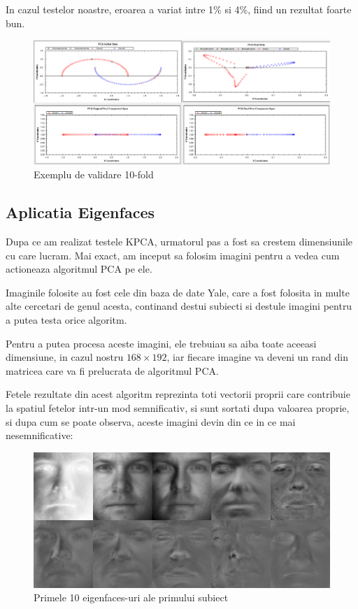 \documentclass[12pt]{article}
\begin{document}
In cazul testelor noastre, eroarea a variat intre 1\% si 4\%, fiind un rezultat foarte bun.

\begin{figure}[H]
\centering
\caption{Exemplu de validare 10-fold}
\includegraphics[width=\linewidth]{tenfold1}
\end{figure}

\newpage

\subsection{Aplicatia Eigenfaces}
Dupa ce am realizat testele KPCA, urmatorul pas a fost sa crestem dimensiunile cu care lucram. Mai exact, am inceput sa folosim imagini pentru a vedea cum actioneaza algoritmul PCA pe ele.

Imaginile folosite au fost cele din baza de date Yale, care a fost folosita in multe alte cercetari de genul acesta, continand destui subiecti si destule imagini pentru a putea testa orice algoritm.

Pentru a putea procesa aceste imagini, ele trebuiau sa aiba toate aceeasi dimensiune, in cazul nostru $168 \times 192$, iar fiecare imagine va deveni un rand din matricea care va fi prelucrata de algoritmul PCA.

Fetele rezultate din acest algoritm reprezinta toti vectorii proprii care contribuie la spatiul fetelor intr-un mod semnificativ, si sunt sortati dupa valoarea proprie, si dupa cum se poate observa, aceste imagini devin din ce in ce mai nesemnificative: 

\begin{figure}[H]
\centering
\caption{Primele 10 eigenfaces-uri ale primului subiect}
\includegraphics[width=\linewidth]{eigenfaces}
\end{figure}
\end{document}
